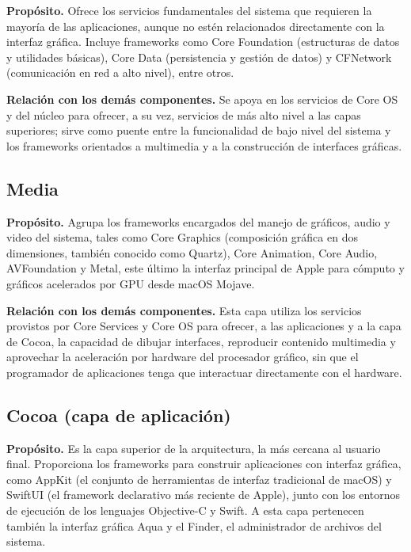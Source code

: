 \documentclass[12pt,letterpaper]{article}
\begin{document}
\textbf{Propósito.} Ofrece los servicios fundamentales del sistema que requieren la mayoría de las aplicaciones, aunque no estén relacionados directamente con la interfaz gráfica. Incluye frameworks como Core Foundation (estructuras de datos y utilidades básicas), Core Data (persistencia y gestión de datos) y CFNetwork (comunicación en red a alto nivel), entre otros.

\textbf{Relación con los demás componentes.} Se apoya en los servicios de Core OS y del núcleo para ofrecer, a su vez, servicios de más alto nivel a las capas superiores; sirve como puente entre la funcionalidad de bajo nivel del sistema y los frameworks orientados a multimedia y a la construcción de interfaces gráficas.

\subsection{Media}

\textbf{Propósito.} Agrupa los frameworks encargados del manejo de gráficos, audio y video del sistema, tales como Core Graphics (composición gráfica en dos dimensiones, también conocido como Quartz), Core Animation, Core Audio, AVFoundation y Metal, este último la interfaz principal de Apple para cómputo y gráficos acelerados por GPU desde macOS Mojave.

\textbf{Relación con los demás componentes.} Esta capa utiliza los servicios provistos por Core Services y Core OS para ofrecer, a las aplicaciones y a la capa de Cocoa, la capacidad de dibujar interfaces, reproducir contenido multimedia y aprovechar la aceleración por hardware del procesador gráfico, sin que el programador de aplicaciones tenga que interactuar directamente con el hardware.

\subsection{Cocoa (capa de aplicación)}

\textbf{Propósito.} Es la capa superior de la arquitectura, la más cercana al usuario final. Proporciona los frameworks para construir aplicaciones con interfaz gráfica, como AppKit (el conjunto de herramientas de interfaz tradicional de macOS) y SwiftUI (el framework declarativo más reciente de Apple), junto con los entornos de ejecución de los lenguajes Objective-C y Swift. A esta capa pertenecen también la interfaz gráfica Aqua y el Finder, el administrador de archivos del sistema.
\end{document}
